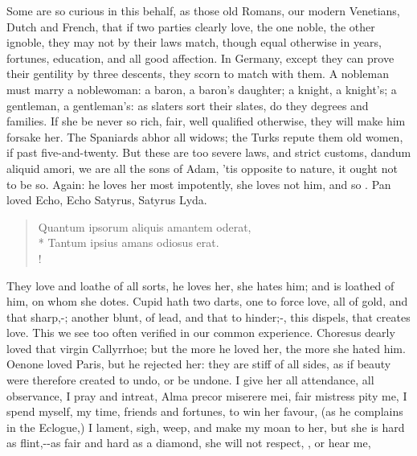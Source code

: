 Some are so curious in this behalf, as those old Romans, our modern
Venetians, Dutch and French, that if two parties clearly love, the one
noble, the other ignoble, they may not by their laws match, though
equal otherwise in years, fortunes, education, and all good affection.
In Germany, except they can prove their gentility by three descents,
they scorn to match with them. A nobleman must marry a noblewoman: a
baron, a baron's daughter; a knight, a knight's; a gentleman, a
gentleman's: as slaters sort their slates, do they degrees and
families. If she be never so rich, fair, well qualified otherwise, they
will make him forsake her. The Spaniards abhor all widows; the Turks
repute them old women, if past five-and-twenty. But these are too
severe laws, and strict customs, dandum aliquid amori, we are all the
sons of Adam, 'tis opposite to nature, it ought not to be so. Again: he
loves her most impotently, she loves not him, and so .
Pan loved Echo, Echo Satyrus, Satyrus Lyda.
%
\begin{latin}
\begin{verse}%
Quantum ipsorum aliquis amantem oderat,\\*
Tantum ipsius amans odiosus erat.\\!
\end{verse}%
\end{latin}

They love and loathe of all sorts, he loves her, she hates him; and is
loathed of him, on whom she dotes. Cupid hath two darts, one to force
love, all of gold, and that sharp,-;
another blunt, of lead, and that to hinder;-, this dispels, that creates love. This we see too often verified
in our common experience. Choresus dearly loved that virgin
Callyrrhoe; but the more he loved her, the more she hated him. Oenone
loved Paris, but he rejected her: they are stiff of all sides, as if
beauty were therefore created to undo, or be undone. I give her all
attendance, all observance, I pray and intreat, Alma precor
miserere mei, fair mistress pity me, I spend myself, my time, friends
and fortunes, to win her favour, (as he complains in the
Eclogue,) I lament, sigh, weep, and make my moan to her, but she
is hard as flint,--as fair and hard as a
diamond, she will not respect, , or hear me,

